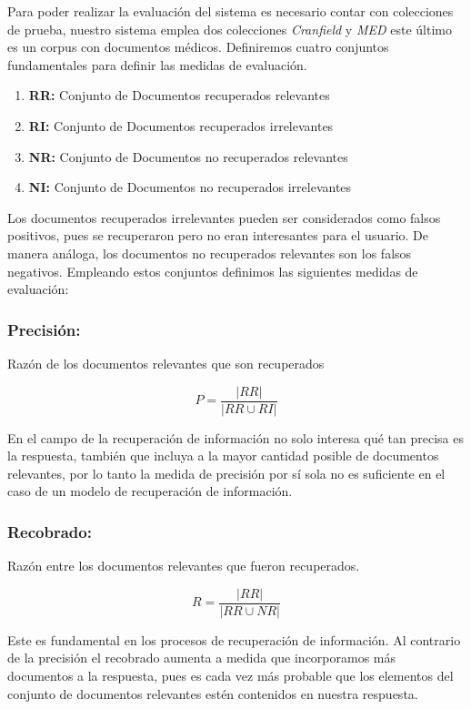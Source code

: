 \documentclass[runningheads,a4paper]{llncs}
\begin{document}
Para poder realizar la evaluación del sistema es necesario contar con colecciones de prueba, nuestro sistema emplea dos colecciones \textit{Cranfield} y \textit{MED} este último es un corpus con documentos médicos. Definiremos cuatro conjuntos fundamentales para definir las medidas de evaluación. 

\begin{enumerate}
	\item[] \textbf{RR:} Conjunto de Documentos recuperados relevantes
	\item[] \textbf{RI:} Conjunto de Documentos recuperados irrelevantes
	\item[] \textbf{NR:} Conjunto de Documentos no recuperados relevantes
	\item[] \textbf{NI:} Conjunto de Documentos no recuperados irrelevantes
\end{enumerate}

Los documentos recuperados irrelevantes pueden ser considerados como falsos
positivos, pues se recuperaron pero no eran interesantes para el usuario. De
manera análoga, los documentos no recuperados relevantes son los falsos
negativos. Empleando estos conjuntos definimos las siguientes medidas de evaluación:

\subsubsection*{Precisión:} Razón de los documentos relevantes que son recuperados

\begin{equation}
	P = \frac{|RR|}{|RR \cup RI|}
\end{equation}

En el campo de la recuperación de información no solo interesa qué tan precisa es la
respuesta, también que incluya a la mayor cantidad posible de documentos
relevantes, por lo tanto la medida de precisión por sí sola no es suficiente en
el caso de un modelo de recuperación de información.

\subsubsection*{Recobrado:} Razón entre los documentos relevantes que fueron recuperados.

\begin{equation}
	R = \frac{|RR|}{|RR \cup NR|}
\end{equation}

Este es fundamental en los procesos de
recuperación de información. Al contrario de la precisión el recobrado
aumenta a medida que incorporamos más documentos a la respuesta, pues es
cada vez más probable que los elementos del conjunto de documentos relevantes
estén contenidos en nuestra respuesta.
\end{document}
